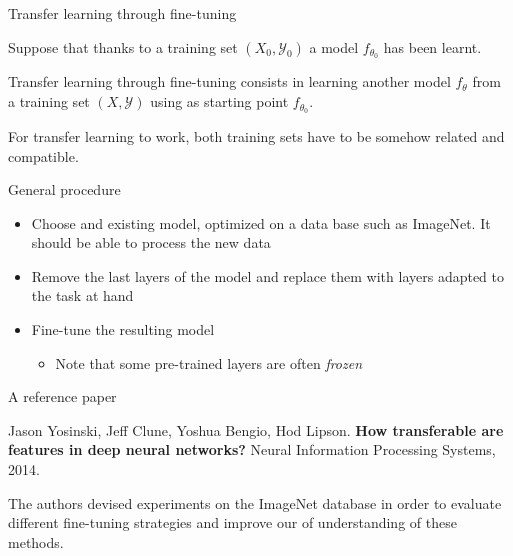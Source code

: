 \documentclass[xcolor=pdftex,dvipsnames,table,mathserif]{beamer}
\begin{document}
\begin{frame}{Transfer learning through fine-tuning}

\begin{block}{}
  Suppose that thanks to a training set $(X_0, \mathcal{Y}_0)$ a model $f_{\theta_0}$ has been learnt.

  Transfer learning through fine-tuning consists in learning another model $f_{\theta}$ from a training set $(X, \mathcal{Y})$ using as starting point $f_{\theta_0}$.

  For transfer learning to work, both training sets have to be somehow related and compatible.
\end{block}

\end{frame}

\begin{frame}{General procedure}

  \begin{itemize}
  \item Choose and existing model, optimized on a data base such as ImageNet. It should be able to process the new data
  \item Remove the last layers of the model and replace them with layers adapted to the task at hand
  \item Fine-tune the resulting model

    \begin{itemize}
    \item Note that some pre-trained layers are often \emph{frozen}
    \end{itemize}
  \end{itemize}

\end{frame}

\begin{frame}{A reference paper \cite{yosinski_how_2014}}

\begin{block}{}
  Jason Yosinski, Jeff Clune, Yoshua Bengio, Hod Lipson. \textbf{How transferable are features in deep neural networks?} Neural Information Processing Systems, 2014.
\end{block}

The authors devised experiments on the ImageNet database in order to evaluate different fine-tuning strategies and improve our of understanding of these methods.

\end{frame}
\end{document}
